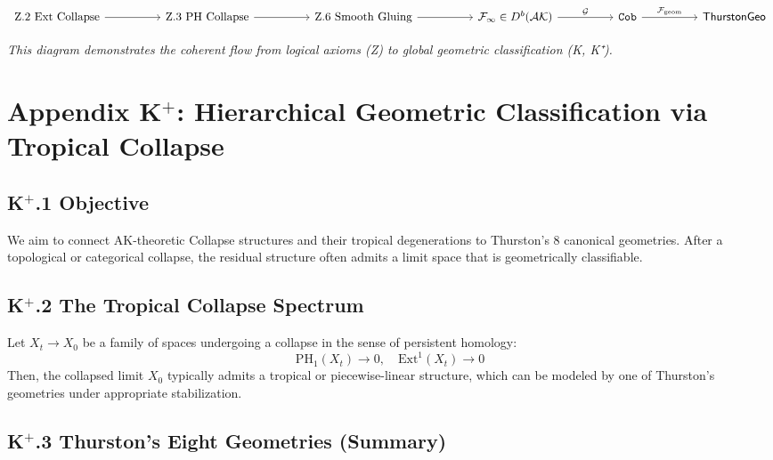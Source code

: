 \documentclass[11pt]{article}
\begin{document}
\begin{axiom}
\begin{axiom}
\[
\begin{tikzcd}[row sep=large, column sep=huge]
\text{Z.2 Ext Collapse} \arrow[r] &
\text{Z.3 PH Collapse} \arrow[r] &
\text{Z.6 Smooth Gluing} \arrow[r] &
\mathcal{F}_\infty \in D^b(\mathcal{AK}) \arrow[r, "\mathcal{G}"] &
\texttt{Cob} \arrow[r, "\mathcal{F}_{\mathrm{geom}}"] &
\mathsf{ThurstonGeo}
\end{tikzcd}
\]

\textit{This diagram demonstrates the coherent flow from logical axioms (Z) to global geometric classification (K, K⁺).}




\section*{Appendix K$^+$: Hierarchical Geometric Classification via Tropical Collapse}

\subsection*{K$^+$.1 Objective}

We aim to connect AK-theoretic Collapse structures and their tropical degenerations  
to Thurston's 8 canonical geometries. After a topological or categorical collapse, the residual structure  
often admits a limit space that is geometrically classifiable.

\subsection*{K$^+$.2 The Tropical Collapse Spectrum}

Let \( X_t \to X_0 \) be a family of spaces undergoing a collapse in the sense of persistent homology:
\[
\mathrm{PH}_1(X_t) \to 0, \quad \mathrm{Ext}^1(X_t) \to 0
\]
Then, the collapsed limit \( X_0 \) typically admits a tropical or piecewise-linear structure,  
which can be modeled by one of Thurston's geometries under appropriate stabilization.

\subsection*{K$^+$.3 Thurston's Eight Geometries (Summary)}


\end{axiom}
\end{axiom}
\end{document}
